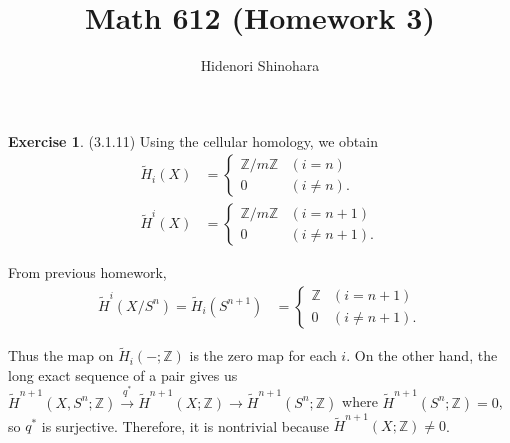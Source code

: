 \documentclass[12pt, psamsfonts]{amsart}
\theoremstyle{definition}
\newtheorem*{exer}{Exercise}
\theoremstyle{remark}
\DeclareMathOperator{\Hom}{Hom}
\DeclareMathOperator{\Ext}{Ext}
\numberwithin{equation}{section}
\begin{document}
\title{Math 612 (Homework 3)}
\author{Hidenori Shinohara}
\maketitle

\begin{exer}{(3.1.11)}
  Using the cellular homology, we obtain
  \begin{align*}
    \tilde{H}_i(X) &= \begin{cases}
      \mathbb{Z} / m\mathbb{Z} & (i = n) \\
      0 & (i \ne n).
    \end{cases} \\
    \tilde{H}^i(X) &= \begin{cases}
      \mathbb{Z} / m\mathbb{Z} & (i = n + 1) \\
      0 & (i \ne n + 1).
    \end{cases}
  \end{align*}

  From previous homework,
  \begin{align*}
    \tilde{H}^i(X / S^n) = \tilde{H}_i(S^{n + 1}) &= \begin{cases}
      \mathbb{Z} & (i = n + 1) \\
      0 & (i \ne n + 1).
    \end{cases}
  \end{align*}

  Thus the map on $\tilde{H}_i(-; \mathbb{Z})$ is the zero map for each $i$.
  On the other hand, the long exact sequence of a pair gives us $\tilde{H}^{n + 1}(X, S^n; \mathbb{Z}) \xrightarrow{q^{\ast}} \tilde{H}^{n + 1}(X; \mathbb{Z}) \rightarrow \tilde{H}^{n + 1}(S^n; \mathbb{Z})$ where $\tilde{H}^{n + 1}(S^n; \mathbb{Z}) = 0$, so $q^{\ast}$ is surjective.
  Therefore, it is nontrivial because $\tilde{H}^{n + 1}(X; \mathbb{Z}) \ne 0$.

  \begin{center}
  \end{center}


\end{exer}
\end{document}
